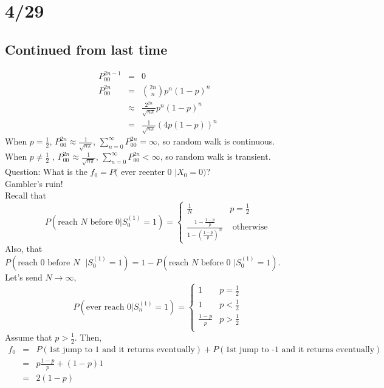 \section*{4/29}
  \subsection*{Continued from last time}
    \begin{eqnarray*}
      P_{00}^{2n - 1} & = & 0\\
      P_{00}^{2n} & = & \binom{2n}{n} p^n (1 - p)^n\\
        & \approx & \frac{2^{2n}}{\sqrt{n\pi}} p^n (1 - p)^n\\
        & = & \frac{1}{\sqrt{n\pi}} (4p(1-p))^n
    \end{eqnarray*}
    When $p = \frac{1}{2}$, $P_{00}^{2n} \approx 
      \frac{1}{\sqrt{n\pi}}$, $\sum_{n = 0}^{\infty} P_{00}^{2n} = 
      \infty$, so random walk is continuous.\\
    When $p \not= \frac{1}{2}$ , $P_{00}^{2n} \approx 
      \frac{1}{\sqrt{n\pi}}$, $\sum_{n = 0}^{\infty} P_{00}^{2n} <
      \infty$, so random walk is transient.\\
    Question: What is the $f_0 = P($ ever reenter 0 $| X_0 = 0)$?\\
    Gambler's ruin!\\
    Recall that
    $$
      P(\text{reach $N$ before 0} | S_0^{(1)} = 1) = 
      \begin{cases}
        \frac{1}{N} & p = \frac{1}{2}\\
        \frac{1 - \frac{1-p}{p}}{1 - \left(\frac{1 - p}{p}\right)^N}
        & \text{ otherwise}
      \end{cases}
    $$
    Also, that $P(\text{reach 0 before $N$ }| S_0^{(1)} = 1) = 
    1 - P(\text{reach $N$ before 0 }| S_0^{(1)} = 1)$.\\
    Let's send $N \to \infty$,
    $$
      P(\text{ever reach 0}| S_n^{(1)} = 1) =
      \begin{cases}
        1 & p = \frac{1}{2}\\
        1 & p < \frac{1}{2}\\
        \frac{1-p}{p} & p > \frac{1}{2}\\
      \end{cases}
    $$
    Assume that $p > \frac{1}{2}$. Then,
    \begin{eqnarray*}
      f_0 & = & P(\text{1st jump to 1 and it returns eventually}) +
      P(\text{1st jump to -1 and it returns eventually})\\
      & = & p\frac{1-p}{p} + (1-p)1 \\
      & = & 2(1-p)\\
    \end{eqnarray*}

